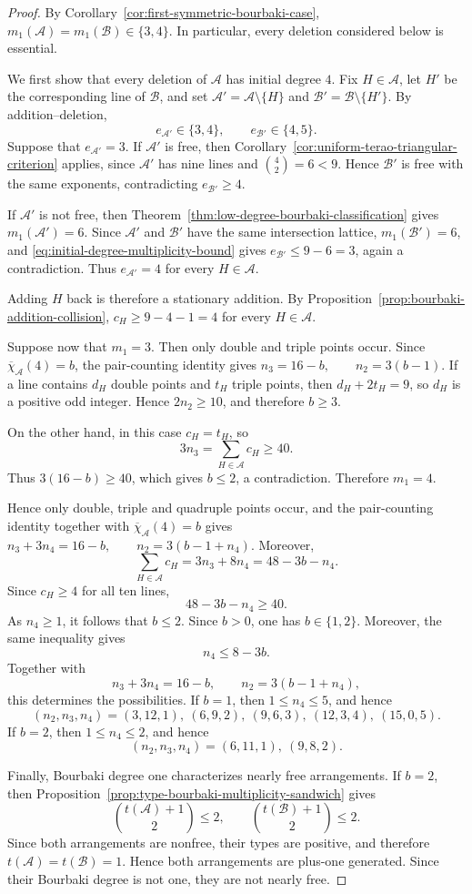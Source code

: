 \documentclass[11pt]{amsart}   %
\theoremstyle{definition}
\def\A{{\mathcal A}}
\def\B{{\mathcal B}}
\begin{document}
\begin{proof}
By Corollary~\ref{cor:first-symmetric-bourbaki-case}, $m_1(\A)=m_1(\B)\in\{3,4\}$. In particular, every deletion considered below is essential.

We first show that every deletion of $\A$ has initial degree $4$. Fix $H\in\A$, let $H'$ be the corresponding line of $\B$, and set $\A'=\A\setminus\{H\}$ and $\B'=\B\setminus\{H'\}$. By addition--deletion,
\[
e_{\A'}\in\{3,4\},
\qquad
e_{\B'}\in\{4,5\}.
\]
Suppose that $e_{\A'}=3$. If $\A'$ is free, then Corollary~\ref{cor:uniform-terao-triangular-criterion} applies, since $\A'$ has nine lines and $\binom42=6<9$. Hence $\B'$ is free with the same exponents, contradicting $e_{\B'}\geq4$.

If $\A'$ is not free, then Theorem~\ref{thm:low-degree-bourbaki-classification} gives $m_1(\A')=6$. Since $\A'$ and $\B'$ have the same intersection lattice, $m_1(\B')=6$, and \eqref{eq:initial-degree-multiplicity-bound} gives $e_{\B'}\leq9-6=3$, again a contradiction. Thus $e_{\A'}=4$ for every $H\in\A$.

Adding $H$ back is therefore a stationary addition. By Proposition~\ref{prop:bourbaki-addition-collision}, $c_H\geq9-4-1=4$ for every $H\in\A$.

Suppose now that $m_1=3$. Then only double and triple points occur. Since $\overline{\chi}_\A(4)=b$, the pair-counting identity gives $n_3=16-b, \qquad n_2=3(b-1).$ If a line contains $d_H$ double points and $t_H$ triple points, then $d_H+2t_H=9$, so $d_H$ is a positive odd integer. Hence $2n_2\geq10$, and therefore $b\geq3$.

On the other hand, in this case $c_H=t_H$, so
\[
3n_3=\sum_{H\in\A}c_H\geq40.
\]
Thus $3(16-b)\geq40$, which gives $b\leq2$, a contradiction. Therefore $m_1=4$.

Hence only double, triple and quadruple points occur, and the pair-counting identity together with $\overline{\chi}_\A(4)=b$ gives $n_3+3n_4=16-b, \qquad n_2=3(b-1+n_4).$ Moreover,
\[
\sum_{H\in\A}c_H
=
3n_3+8n_4
=
48-3b-n_4.
\]
Since $c_H\geq4$ for all ten lines,
\[
48-3b-n_4\geq40.
\]
As $n_4\geq1$, it follows that $b\leq2$. Since $b>0$, one has
$b\in\{1,2\}$.
Moreover, the same inequality gives
\[
n_4\leq8-3b.
\]
Together with
\[
n_3+3n_4=16-b,\qquad
n_2=3(b-1+n_4),
\]
this determines the possibilities. If $b=1$, then
$1\leq n_4\leq5$, and hence
\[
(n_2,n_3,n_4)
=
(3,12,1),\ (6,9,2),\ (9,6,3),\ (12,3,4),\ (15,0,5).
\]
If $b=2$, then $1\leq n_4\leq2$, and hence
\[
(n_2,n_3,n_4)
=
(6,11,1),\ (9,8,2).
\]

Finally, Bourbaki degree one characterizes nearly free arrangements.
If $b=2$, then
Proposition~\ref{prop:type-bourbaki-multiplicity-sandwich} gives
\[
\binom{t(\A)+1}{2}\leq2,
\qquad
\binom{t(\B)+1}{2}\leq2.
\]
Since both arrangements are nonfree, their types are positive, and
therefore $t(\A)=t(\B)=1$. Hence both arrangements are plus-one
generated. Since their Bourbaki degree is not one, they are not
nearly free.
\end{proof}
\end{document}
